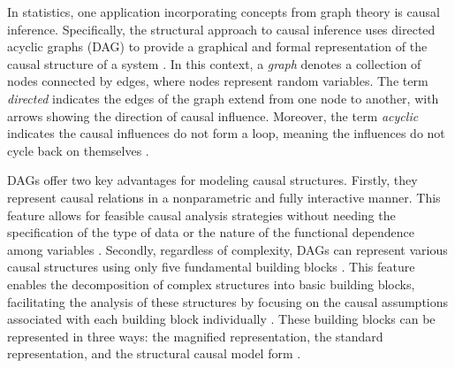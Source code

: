 \documentclass[
  authoryear,
  preprint,
  1p]{elsarticle}
\begin{document}
In statistics, one application incorporating concepts from graph theory
is causal inference. Specifically, the structural approach to causal
inference uses directed acyclic graphs (DAG) to provide a graphical and
formal representation of the causal structure of a system
\citep{Neal_2020}. In this context, a \emph{graph} denotes a collection
of nodes connected by edges, where nodes represent random variables. The
term \emph{directed} indicates the edges of the graph extend from one
node to another, with arrows showing the direction of causal influence.
Moreover, the term \emph{acyclic} indicates the causal influences do not
form a loop, meaning the influences do not cycle back on themselves
\citep{McElreath_2020}.

DAGs offer two key advantages for modeling causal structures. Firstly,
they represent causal relations in a nonparametric and fully interactive
manner. This feature allows for feasible causal analysis strategies
without needing the specification of the type of data or the nature of
the functional dependence among variables \citep{Morgan_et_al_2014}.
Secondly, regardless of complexity, DAGs can represent various causal
structures using only five fundamental building blocks
\citep{Neal_2020, McElreath_2020}. This feature enables the
decomposition of complex structures into basic building blocks,
facilitating the analysis of these structures by focusing on the causal
assumptions associated with each building block individually
\citep{McElreath_2020}. These building blocks can be represented in
three ways: the magnified representation, the standard representation,
and the structural causal model form \citep[SCM,][]{Morgan_et_al_2014}.

\newcommand{\dsep}{\perp\!\!\!\perp}
\newcommand{\ndsep}{\not\!\perp\!\!\!\perp}
\end{document}
